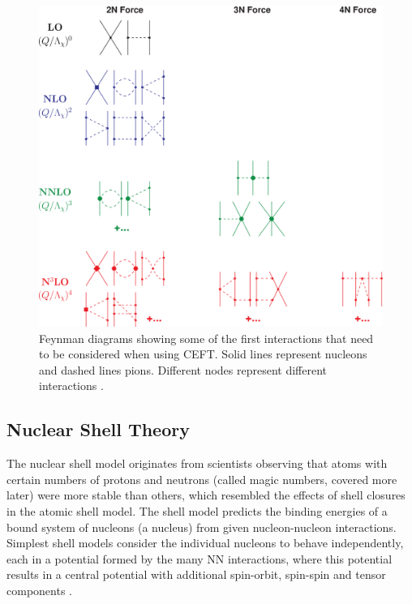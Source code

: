 \begin{figure}[H]
    \centering
    \includegraphics[width=.45\textwidth]{images/NFT_diagram.png}
    \caption{Feynman diagrams showing some of the first interactions that need to be considered when using CEFT. Solid lines represent nucleons and dashed lines pions. Different nodes represent different interactions \cite{machleidt_chiral_2011}.}\label{fig:diagram1}
\end{figure}

\subsection{Nuclear Shell Theory}
The nuclear shell model originates from scientists observing that atoms with certain numbers of protons and neutrons (called magic numbers, covered more later) were more stable than others, which resembled the effects of shell closures in the atomic shell model.
The shell model predicts the binding energies of a bound system of nucleons (a nucleus) from given nucleon-nucleon interactions.
Simplest shell models consider the individual nucleons to behave independently, each in a potential formed by the many NN interactions, where this potential results in a central potential with additional spin-orbit, spin-spin and tensor components \cite{kruecken_introduction_2011}.


